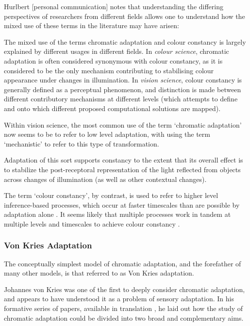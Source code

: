 Hurlbert [personal communication] notes that understanding the differing perspectives of researchers from different fields allows one to understand how the mixed use of these terms in the literature may have arisen: 

\begin{itquote}{}
The mixed use of the terms chromatic adaptation and colour constancy is largely explained by different usages in different fields. In \emph{colour science}, chromatic adaptation is often considered synonymous with colour constancy, as it is considered to be the only mechanism contributing to stabilising colour appearance under changes in illumination. In \emph{vision science}, colour constancy is generally defined as a perceptual phenomenon, and distinction is made between different contributory mechanisms at different levels (which \citet{hurlbert_computational_1998} attempts to define and onto which different proposed computational solutions are mapped).
\end{itquote}

Within vision science, the most common use of the term `chromatic adaptation' now seems to be to refer to low level adaptation, with \citet{brainard_color_2014} using the term `mechanistic' to refer to this type of transformation.

\begin{itquote}
Adaptation of this sort supports constancy to the extent that its overall effect is to stabilize the post-receptoral representation of the light reflected from objects across changes of illumination (as well as other contextual changes).
\end{itquote}

The term `colour constancy', by contrast, is used to refer to higher level inference-based processes, which occur at faster timescales than are possible by adaptation alone \citep{rinner_time_2000}. It seems likely that multiple processes work in tandem at multiple levels and timescales to achieve colour constancy \citep{hurlbert_colour_2007}.



\subsubsection{Von Kries Adaptation}

The conceptually simplest model of chromatic adaptation, and the forefather of many other models, is that referred to as Von Kries adaptation.

Johannes von Kries was one of the first to deeply consider chromatic adaptation, and appears to have understood it as a problem of sensory adaptation. In his formative series of papers, available in translation \citep{von_kries_beitrag_1970}, he laid out how the study of chromatic adaptation could be divided into two broad and complementary aims. 

